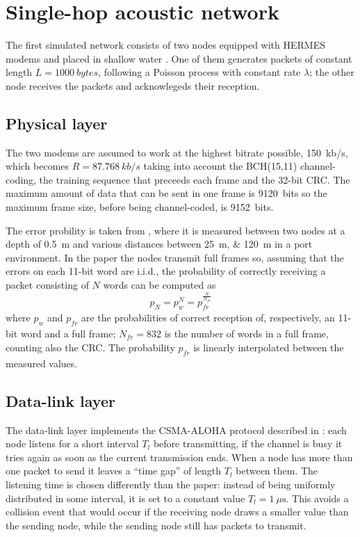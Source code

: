 \section{Single-hop acoustic network}
The first simulated network consists of two nodes equipped with HERMES
modems and placed in shallow water . One of them generates packets of
constant length $L=\SI{1000}{bytes}$, following a Poisson process with
constant rate $\lambda$; the other node receives the packets and
acknowlegeds their reception.

\subsection{Physical layer}
The two modems are assumed to work at the highest bitrate possible,
\SI{150}{kb/s}, which becomes $R = \SI{87.768}{kb/s}$ taking into
account the BCH(15,11) channel-coding, the training sequence that
preceeds each frame and the 32-bit CRC.
%
The maximum amount of data that can be sent in one frame
is \SI{9120}{bits} so the maximum frame size, before being
channel-coded, is \SI{9152}{bits}.

The error probility is taken from \cite{hermes}, where it is measured
between two nodes at a depth of \SI{0.5}{\m} and various distances
between \SIlist{25; 120}{\m} in a port environment. In the paper the
nodes transmit full frames so, assuming that the errors on each 11-bit
word are i.i.d., the probability of correctly receiving a packet
consisting of $N$ words can be computed as
\begin{equation}
  p_N = p_w^N = p_{\mathit{fr}}^\frac{N}{N_{\mathit{fr}}}
  \label{eq:pN}
\end{equation}
where $p_w$ and $p_{\mathit{fr}}$ are the probabilities of correct
reception of, respectively, an 11-bit word and a full frame;
$N_{\mathit{fr}} = 832$ is the number of words in a full frame,
counting also the CRC.
%
The probability $p_{\mathit{fr}}$ is linearly interpolated between the
measured values.

\subsection{Data-link layer}
The data-link layer implements the CSMA-ALOHA protocol described in
\cite{proto_issues}: each node listens for a short interval $T_l$
before transmitting, if the channel is busy it tries again as soon as
the current transmission ends. When a node has more than one packet to
send it leaves a ``time gap'' of length $T_l$ between them.
%
The listening time is chosen differently than the paper: instead of
being uniformly distributed in some interval, it is set to a constant
value $T_l = \SI{1}{\mu\s}$. This avoids a collision event that would
occur if the receiving node draws a smaller value than the sending
node, while the sending node still has packets to transmit.


